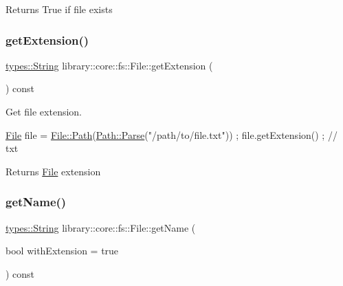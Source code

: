 \begin{DoxyReturn}{Returns}
True if file exists 
\end{DoxyReturn}
\mbox{\label{classlibrary_1_1core_1_1fs_1_1File_a157085065abfb37e58a1d5ea44eb96e8}} 
\subsubsection{\texorpdfstring{get\+Extension()}{getExtension()}}
{\footnotesize\ttfamily \hyperlink{classlibrary_1_1core_1_1types_1_1String}{types\+::\+String} library\+::core\+::fs\+::\+File\+::get\+Extension (\begin{DoxyParamCaption}{ }\end{DoxyParamCaption}) const}



Get file extension. 


\begin{DoxyCode}
\hyperlink{classlibrary_1_1core_1_1fs_1_1File_a7490060f19a21d4ee58bb6cec87a1ca6}{File} file = \hyperlink{classlibrary_1_1core_1_1fs_1_1File_a0e0d8a8becb3cdd21775554e181452d8}{File::Path}(\hyperlink{classlibrary_1_1core_1_1fs_1_1Path_aebf5bd3af83e0b7376616e146f3e55df}{Path::Parse}(\textcolor{stringliteral}{"/path/to/file.txt"})) ;
file.getExtension() ; \textcolor{comment}{// txt}
\end{DoxyCode}


\begin{DoxyReturn}{Returns}
\hyperlink{classlibrary_1_1core_1_1fs_1_1File}{File} extension 
\end{DoxyReturn}
\mbox{\label{classlibrary_1_1core_1_1fs_1_1File_affd399abd971505b424d7ced3d43c61d}} 
\subsubsection{\texorpdfstring{get\+Name()}{getName()}}
{\footnotesize\ttfamily \hyperlink{classlibrary_1_1core_1_1types_1_1String}{types\+::\+String} library\+::core\+::fs\+::\+File\+::get\+Name (\begin{DoxyParamCaption}\item[{bool}]{with\+Extension = {\ttfamily true} }\end{DoxyParamCaption}) const}



